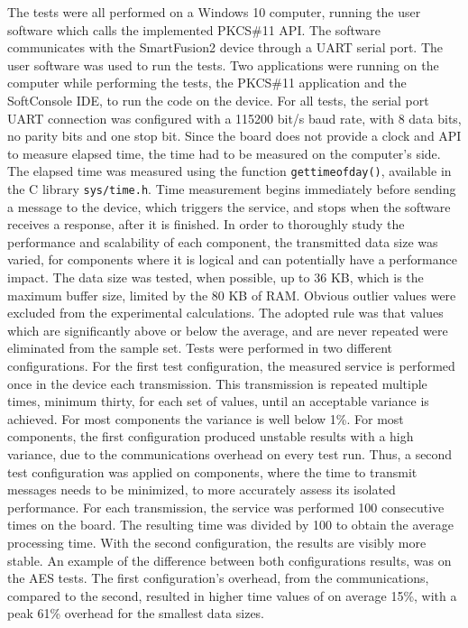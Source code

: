 The tests were all performed on a Windows 10 computer, running the user software which calls the implemented PKCS\#11 API. The software communicates with the SmartFusion2 device through a UART serial port. The user software was used to run the tests.
Two applications were running on the computer while performing the tests, the PKCS\#11 application and the SoftConsole IDE, to run the code on the device.
For all tests, the serial port UART connection was configured with a 115200 bit/s baud rate, with 8 data bits, no parity bits and one stop bit.
Since the board does not provide a clock and API to measure elapsed time, the time had to be measured on the computer's side.
The elapsed time was measured using the function \texttt{gettimeofday()}, available in the C library \texttt{sys/time.h}.
Time measurement begins immediately before sending a message to the device, which triggers the service, and stops when the software receives a response, after it is finished.
In order to thoroughly study the performance and scalability of each component, the transmitted data size was varied, for components where it is logical and can potentially have a performance impact. The data size was tested, when possible, up to 36 KB, which is the maximum buffer size, limited by the 80 KB of RAM.
Obvious outlier values were excluded from the experimental calculations. The adopted rule was that values which are significantly above or below the average, and are never repeated were eliminated from the sample set.
Tests were performed in two different configurations.
For the first test configuration, the measured service is performed once in the device each transmission. This transmission is repeated multiple times, minimum thirty, for each set of values, until an acceptable variance is achieved. For most components the variance is well below 1\%.
For most components, the first configuration produced unstable results with a high variance, due to the communications overhead on every test run.
Thus, a second test configuration was applied on components, where the time to transmit messages needs to be minimized, to more accurately assess its isolated performance. For each transmission, the service was performed 100 consecutive times on the board. The resulting time was divided by 100 to obtain the average processing time.
With the second configuration, the results are visibly more stable.
An example of the difference between both configurations results, was on the AES tests. The first configuration's overhead, from the communications, compared to the second, resulted in higher time values of on average 15\%, with a peak 61\% overhead for the smallest data sizes.%

